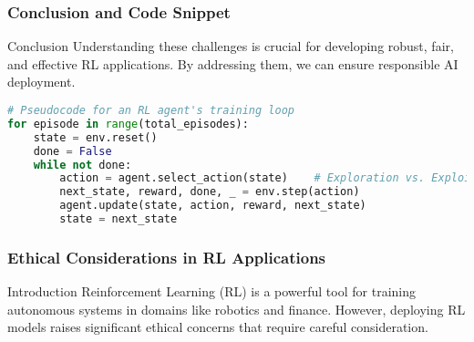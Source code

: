 \documentclass[aspectratio=169]{beamer}
\begin{document}
\begin{frame}[fragile]
    \frametitle{Conclusion and Code Snippet}
    \begin{block}{Conclusion}
        Understanding these challenges is crucial for developing robust, fair, and effective RL applications. By addressing them, we can ensure responsible AI deployment.
    \end{block}

    \begin{lstlisting}[language=Python]
# Pseudocode for an RL agent's training loop
for episode in range(total_episodes):
    state = env.reset()
    done = False
    while not done:
        action = agent.select_action(state)    # Exploration vs. Exploitation
        next_state, reward, done, _ = env.step(action)
        agent.update(state, action, reward, next_state)
        state = next_state
    \end{lstlisting}
\end{frame}

\begin{frame}[fragile]
    \frametitle{Ethical Considerations in RL Applications}
    \begin{block}{Introduction}
        Reinforcement Learning (RL) is a powerful tool for training autonomous systems in domains like robotics and finance. However, deploying RL models raises significant ethical concerns that require careful consideration.
    \end{block}
\end{frame}
\end{document}
